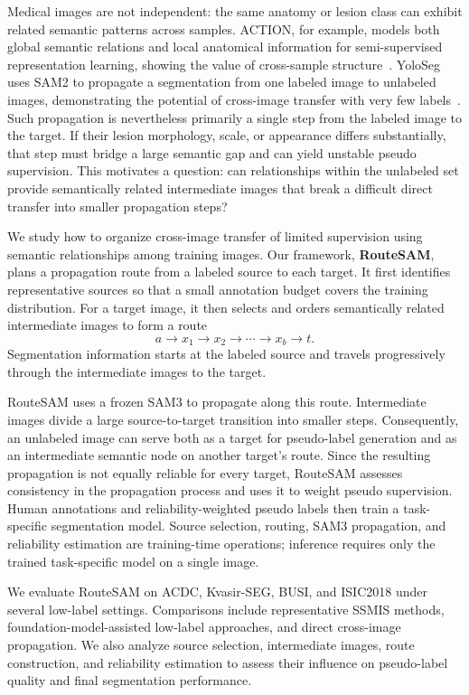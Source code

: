 \documentclass[a4paper,fleqn]{cas-dc}
\begin{document}
Medical images are not independent: the same anatomy or lesion class can exhibit related semantic patterns across samples. ACTION, for example, models both global semantic relations and local anatomical information for semi-supervised representation learning, showing the value of cross-sample structure~\cite{you2022action}. YoloSeg uses SAM2 to propagate a segmentation from one labeled image to unlabeled images, demonstrating the potential of cross-image transfer with very few labels~\cite{zhang2026yoloseg}. Such propagation is nevertheless primarily a single step from the labeled image to the target. If their lesion morphology, scale, or appearance differs substantially, that step must bridge a large semantic gap and can yield unstable pseudo supervision. This motivates a question: can relationships within the unlabeled set provide semantically related intermediate images that break a difficult direct transfer into smaller propagation steps?

We study how to organize cross-image transfer of limited supervision using semantic relationships among training images. Our framework, \textbf{RouteSAM}, plans a propagation route from a labeled source to each target. It first identifies representative sources so that a small annotation budget covers the training distribution. For a target image, it then selects and orders semantically related intermediate images to form a route
\begin{equation}
a\rightarrow x_1\rightarrow x_2\rightarrow\cdots\rightarrow x_b\rightarrow t.
\end{equation}
Segmentation information starts at the labeled source and travels progressively through the intermediate images to the target.

RouteSAM uses a frozen SAM3 to propagate along this route. Intermediate images divide a large source-to-target transition into smaller steps. Consequently, an unlabeled image can serve both as a target for pseudo-label generation and as an intermediate semantic node on another target's route. Since the resulting propagation is not equally reliable for every target, RouteSAM assesses consistency in the propagation process and uses it to weight pseudo supervision. Human annotations and reliability-weighted pseudo labels then train a task-specific segmentation model. Source selection, routing, SAM3 propagation, and reliability estimation are training-time operations; inference requires only the trained task-specific model on a single image.

We evaluate RouteSAM on ACDC, Kvasir-SEG, BUSI, and ISIC2018 under several low-label settings. Comparisons include representative SSMIS methods, foundation-model-assisted low-label approaches, and direct cross-image propagation. We also analyze source selection, intermediate images, route construction, and reliability estimation to assess their influence on pseudo-label quality and final segmentation performance.
\end{document}
